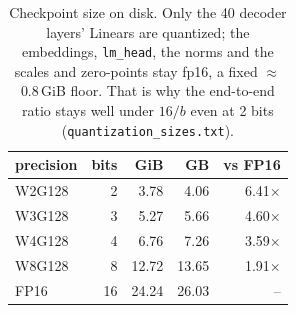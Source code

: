 \begin{table}[t]
\centering
\small
\begin{tabular}{lrrrr}
\toprule
precision & bits & GiB & GB & vs FP16 \\
\midrule
W2G128 & 2 & 3.78 & 4.06 & 6.41$\times$ \\
W3G128 & 3 & 5.27 & 5.66 & 4.60$\times$ \\
W4G128 & 4 & 6.76 & 7.26 & 3.59$\times$ \\
W8G128 & 8 & 12.72 & 13.65 & 1.91$\times$ \\
FP16 & 16 & 24.24 & 26.03 & -- \\
\bottomrule
\end{tabular}
\caption{Checkpoint size on disk. Only the 40 decoder layers' Linears are quantized; the embeddings, \texttt{lm\_head}, the norms and the scales and zero-points stay fp16, a fixed $\approx$0.8\,GiB floor. That is why the end-to-end ratio stays well under $16/b$ even at 2 bits (\texttt{quantization\_sizes.txt}).}
\label{tab:sizes}
\end{table}
